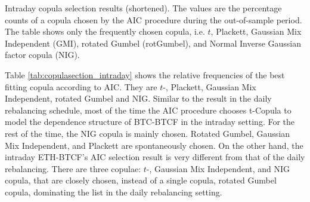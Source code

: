 \documentclass[11pt,a4paper,english]{article}
\begin{document}
\begin{table}[t]

 \caption{Intraday copula selection results (shortened).
        The values are the percentage counts of a copula chosen by the AIC procedure during the out-of-sample period.
        The table shows only the frequently chosen copula, i.e. $t$, Plackett, Gaussian Mix Independent (GMI), rotated Gumbel (rotGumbel), and
        Normal Inverse Gaussian factor copula (NIG).
        }
    \label{tab:copulasection_intraday}
\end{table}


Table \ref{tab:copulasection_intraday} shows the relative frequencies
of the best fitting copula according to AIC.
They are $t$-, Plackett, Gaussian Mix Independent, rotated Gumbel and NIG.
Similar to the result in the daily rebalancing schedule, most of the time the AIC procedure chooses t-Copula to model
the dependence structure of BTC-BTCF in the intraday setting.
For the rest of the time, the NIG copula is mainly chosen.
Rotated Gumbel, Gaussian Mix Independent, and Plackett are spontaneously chosen.
On the other hand, the intraday ETH-BTCF’s AIC selection result is very different from that of the daily rebalancing.
There are three copulae: $t$-, Gaussian Mix Independent, and NIG copula, that are closely chosen, instead of a single copula, rotated Gumbel copula, dominating the list in the daily rebalancing setting.
\end{document}
